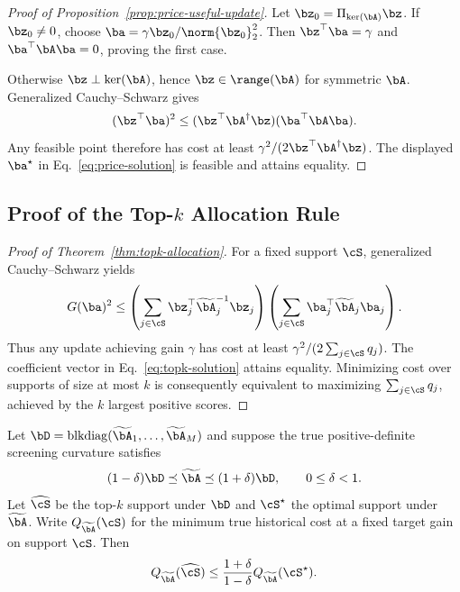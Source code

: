 \begin{proof}[Proof of Proposition~\ref{prop:price-useful-update}]
Let $\bz_0=\Pi_{\ker(\bA)}\bz$. If $\bz_0\neq0$, choose
$\ba=\gamma\bz_0/\norm{\bz_0}_2^2$. Then
$\bz^\top\ba=\gamma$ and $\ba^\top\bA\ba=0$, proving the first case.

Otherwise $\bz\perp\ker(\bA)$, hence $\bz\in\range(\bA)$ for symmetric
$\bA$. Generalized Cauchy--Schwarz gives
\begin{equation}
(\bz^\top\ba)^2
\leq(\bz^\top\bA^\dagger\bz)(\ba^\top\bA\ba).
\end{equation}
Any feasible point therefore has cost at least
$\gamma^2/(2\bz^\top\bA^\dagger\bz)$. The displayed $\ba^\star$ in
Eq.~\eqref{eq:price-solution} is feasible and attains equality.
\end{proof}

\subsection{Proof of the Top-$k$ Allocation Rule}

\begin{proof}[Proof of Theorem~\ref{thm:topk-allocation}]
For a fixed support $\cS$, generalized Cauchy--Schwarz yields
\begin{equation}
G(\ba)^2
\leq\left(\sum_{j\in\cS}\bz_j^\top
\widetilde{\bA}_j^{-1}\bz_j\right)
\left(\sum_{j\in\cS}\ba_j^\top
\widetilde{\bA}_j\ba_j\right).
\end{equation}
Thus any update achieving gain $\gamma$ has cost at least
$\gamma^2/(2\sum_{j\in\cS}q_j)$. The coefficient vector in
Eq.~\eqref{eq:topk-solution} attains equality. Minimizing cost over supports of
size at most $k$ is consequently equivalent to maximizing
$\sum_{j\in\cS}q_j$, achieved by the $k$ largest positive scores.
\end{proof}

\begin{corollary}
\label{cor:approx-block-allocation}
Let $\bD=\operatorname{blkdiag}(\widetilde{\bA}_1,\ldots,
\widetilde{\bA}_M)$ and suppose the true positive-definite screening curvature
satisfies
\begin{equation}
(1-\delta)\bD\preceq\widetilde{\bA}\preceq(1+\delta)\bD,
\qquad 0\leq\delta<1.
\end{equation}
Let $\widehat{\cS}$ be the top-$k$ support under $\bD$ and $\cS^\star$ the
optimal support under $\widetilde{\bA}$. Write
$Q_{\widetilde{\bA}}(\cS)$ for the minimum true
historical cost at a fixed target gain on support $\cS$. Then
\begin{equation}
Q_{\widetilde{\bA}}(\widehat{\cS})
\leq\frac{1+\delta}{1-\delta}
Q_{\widetilde{\bA}}(\cS^\star).
\end{equation}
\end{corollary}

